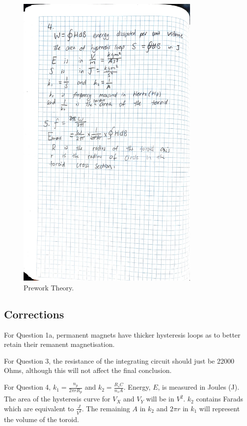 \documentclass{article}
\begin{document}
\begin{figure}[H]
    \centering
    \includegraphics[width=0.8\textwidth]{prework2.jpg}
    \caption{Prework Theory.}
\end{figure}

\subsection{Corrections}
For Question 1a, permanent magnets have thicker hysteresis loops as to better retain their 
remanent magnetisation.

For Question 3, the resistance of the integrating circuit should just be 22000 Ohms, although
this will not affect the final conclusion.

For Question 4, $k_1 = \frac{n_p}{2\pi r R_p}$ and $k_2 = \frac{R_s C}{n_s A}$. Energy, $E$,
is measured in Joules (J). The area of the hysteresis curve for $V_X$ and 
$V_Y$ will be in $V^2$. $k_2$ contains Farads which are equivalent to $\frac{J}{V^2}$. The 
remaining $A$ in $k_2$ and $2\pi r$ in $k_1$ will represent the volume of the toroid.
\end{document}

